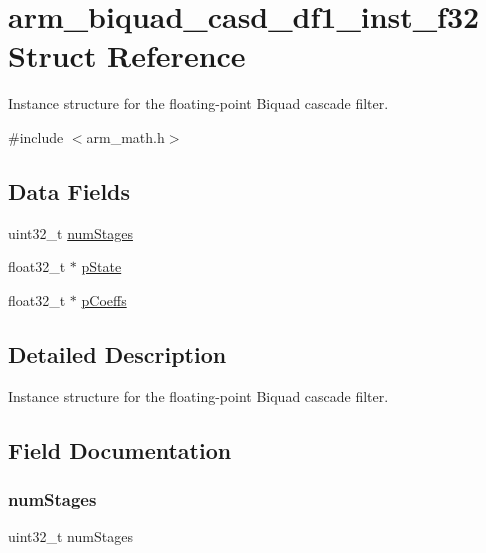 \hypertarget{structarm__biquad__casd__df1__inst__f32}{}\section{arm\+\_\+biquad\+\_\+casd\+\_\+df1\+\_\+inst\+\_\+f32 Struct Reference}
\label{structarm__biquad__casd__df1__inst__f32}


Instance structure for the floating-\/point Biquad cascade filter.  




{\ttfamily \#include $<$arm\+\_\+math.\+h$>$}

\subsection*{Data Fields}
\begin{DoxyCompactItemize}
\item 
uint32\+\_\+t \mbox{\hyperlink{structarm__biquad__casd__df1__inst__f32_aed9c8a6224cd149e8e12b17b25b9b767}{num\+Stages}}
\item 
float32\+\_\+t $\ast$ \mbox{\hyperlink{structarm__biquad__casd__df1__inst__f32_a335c87e6fdc4b96601d95a5de8b9c463}{p\+State}}
\item 
float32\+\_\+t $\ast$ \mbox{\hyperlink{structarm__biquad__casd__df1__inst__f32_aacbb8dd8eeba4b21fc2bb40076405ee3}{p\+Coeffs}}
\end{DoxyCompactItemize}


\subsection{Detailed Description}
Instance structure for the floating-\/point Biquad cascade filter. 

\subsection{Field Documentation}
\mbox{\label{structarm__biquad__casd__df1__inst__f32_aed9c8a6224cd149e8e12b17b25b9b767}} 
\subsubsection{\texorpdfstring{num\+Stages}{numStages}}
{\footnotesize\ttfamily uint32\+\_\+t num\+Stages}

